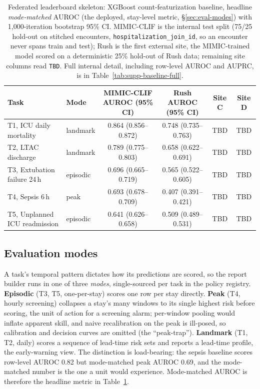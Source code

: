 \begin{table}[t]
\centering
\footnotesize
\setlength{\tabcolsep}{4pt}
\caption{Federated leaderboard skeleton: XGBoost count-featurization
baseline, headline \emph{mode-matched} AUROC (the deployed,
stay-level metric, \S\ref{sec:eval-modes}) with 1{,}000-iteration
bootstrap 95\% CI. MIMIC-CLIF is the internal test split (75/25
hold-out on stitched encounters, \texttt{hospitalization\_join\_id}, so
an encounter never spans train and test); Rush is the first external
site, the MIMIC-trained model scored on a deterministic 25\% hold-out of
Rush data; remaining site columns read \texttt{TBD}. Full internal
detail, including row-level AUROC and AUPRC, is in
Table~\ref{tab:supp-baseline-full}.}
\label{tab:baseline}
\begin{tabular}{l l c c cc}
\toprule
Task & Mode & MIMIC-CLIF AUROC (95\% CI) & Rush AUROC (95\% CI) & Site C & Site D \\
\midrule
T1, ICU daily mortality       & landmark & 0.864 (0.856--0.872) & 0.748 (0.735--0.763) & TBD & TBD \\
T2, LTAC discharge            & landmark & 0.789 (0.775--0.803) & 0.658 (0.622--0.691) & TBD & TBD \\
T3, Extubation failure 24\,h  & episodic & 0.696 (0.665--0.719) & 0.565 (0.522--0.605) & TBD & TBD \\
T4, Sepsis 6\,h               & peak     & 0.693 (0.678--0.709) & 0.407 (0.391--0.421) & TBD & TBD \\
T5, Unplanned ICU readmission & episodic & 0.641 (0.626--0.658) & 0.509 (0.489--0.531) & TBD & TBD \\
\bottomrule
\end{tabular}
\end{table}

\subsection*{Evaluation modes}
\label{sec:eval-modes}

A task's temporal pattern dictates how its predictions are scored, so
the report builder runs in one of three \emph{modes}, single-sourced per
task in the policy registry. \textbf{Episodic} (T3, T5, one-per-stay)
scores one row per stay directly. \textbf{Peak} (T4, hourly screening)
collapses a stay's many windows to its single highest risk before
scoring, the unit of action for a screening alarm; per-window pooling
would inflate apparent skill, and naive recalibration on the peak is
ill-posed, so calibration and decision curves are omitted (the
``peak-trap''). \textbf{Landmark} (T1, T2, daily) scores a sequence of
lead-time risk sets and reports a lead-time profile, the early-warning
view. The distinction is load-bearing: the sepsis baseline scores
row-level AUROC 0.82 but mode-matched peak AUROC 0.69, and the
mode-matched number is the one a unit would experience. Mode-matched
AUROC is therefore the headline metric in Table~\ref{tab:baseline}.


